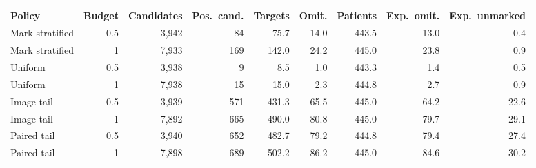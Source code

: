\begin{tabular}{lrrrrrrrr}
\toprule
Policy & Budget & Candidates & Pos.\ cand. & Targets & Omit. & Patients & Exp.\ omit. & Exp.\ unmarked \\
\midrule
Mark stratified & 0.5 & 3,942 & 84 & 75.7 & 14.0 & 443.5 & 13.0 & 0.4 \\
Mark stratified & 1 & 7,933 & 169 & 142.0 & 24.2 & 445.0 & 23.8 & 0.9 \\
Uniform & 0.5 & 3,938 & 9 & 8.5 & 1.0 & 443.3 & 1.4 & 0.5 \\
Uniform & 1 & 7,938 & 15 & 15.0 & 2.3 & 444.8 & 2.7 & 0.9 \\
Image tail & 0.5 & 3,939 & 571 & 431.3 & 65.5 & 445.0 & 64.2 & 22.6 \\
Image tail & 1 & 7,892 & 665 & 490.0 & 80.8 & 445.0 & 79.7 & 29.1 \\
Paired tail & 0.5 & 3,940 & 652 & 482.7 & 79.2 & 444.8 & 79.4 & 27.4 \\
Paired tail & 1 & 7,898 & 689 & 502.2 & 86.2 & 445.0 & 84.6 & 30.2 \\
\bottomrule
\end{tabular}
